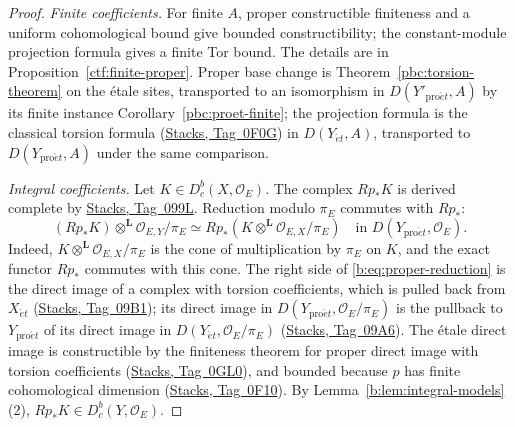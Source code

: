\documentclass[11pt,a4paper]{article}
\numberwithin{equation}{section}
\theoremstyle{definition}
\theoremstyle{remark}
\newcommand{\D}{D}
\newcommand{\Dbc}{D^b_c}
\newcommand{\et}{\acute{e}t}
\newcommand{\proet}{\mathrm{pro}\acute{e}t}
\newcommand{\stacks}[1]{\href{https://stacks.math.columbia.edu/tag/#1}{\textnormal{Stacks, Tag~#1}}}
\begin{document}
\begin{proof}
\emph{Finite coefficients.} For finite $A$, proper constructible
finiteness and a uniform cohomological bound give bounded
constructibility; the constant-module projection formula gives a
finite Tor bound. The details are in Proposition~\ref{ctf:finite-proper}.
Proper base change is Theorem~\ref{pbc:torsion-theorem} on the \'etale
sites, transported to an isomorphism in $\D(Y'_{\proet},A)$ by its finite
instance Corollary~\ref{pbc:proet-finite}; the projection formula is the
classical torsion formula (\stacks{0F0G}) in $\D(Y_{\et},A)$, transported
to $\D(Y_{\proet},A)$ under the same comparison.

\emph{Integral coefficients.} Let $K\in\Dbc(X,\mathcal O_E)$. The complex
$Rp_*K$ is derived complete by \stacks{099L}. Reduction modulo $\pi_E$
commutes with $Rp_*$:
\begin{equation}
 (Rp_*K)\otimes^{\mathbf L}\mathcal O_{E,Y}/\pi_E
       \simeq Rp_*(K\otimes^{\mathbf L}\mathcal O_{E,X}/\pi_E)
       \quad\text{in }\D(Y_{\proet},\mathcal O_E).
\label{b:eq:proper-reduction}
\end{equation}
Indeed, $K\otimes^{\mathbf L}\mathcal O_{E,X}/\pi_E$ is the cone of
multiplication by $\pi_E$ on $K$, and the exact functor $Rp_*$ commutes
with this cone. The right side of \eqref{b:eq:proper-reduction} is the
direct image of a complex with torsion coefficients, which is pulled back
from $X_{\et}$ (\stacks{09B1}); its direct image in
$\D(Y_{\proet},\mathcal O_E/\pi_E)$ is the pullback to $Y_{\proet}$ of its
direct image in $\D(Y_{\et},\mathcal O_E/\pi_E)$ (\stacks{09A6}). The \'etale direct
image is constructible by the finiteness theorem for proper direct image
with torsion coefficients (\stacks{0GL0}), and bounded because $p$ has
finite cohomological dimension (\stacks{0F10}). By
Lemma~\ref{b:lem:integral-models}(2), $Rp_*K\in\Dbc(Y,\mathcal O_E)$.


\end{proof}
\end{document}
